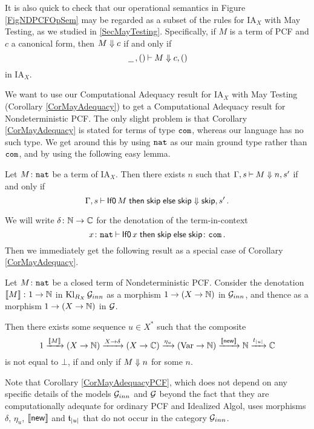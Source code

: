 It is also quick to check that our operational semantics in Figure \ref{FigNDPCFOpSem} may be regarded as a subset of the rules for IA${}_X$ with May Testing, as we studied in \sec \ref{SecMayTesting}.
Specifically, if $M$ is a term of PCF and $c$ a canonical form, then $M\Downarrow c$ if and only if
\[
  \,\underline{\hspace{1.5ex}}\,,()\mathbin{\vdash} M\Downarrow c,()
  \]
in IA${}_X$.

We want to use our Computational Adequacy result for IA${}_X$ with May Testing (Corollary \ref{CorMayAdequacy}) to get a Computational Adequacy result for Nondeterministic PCF.
The only slight problem is that Corollary \ref{CorMayAdequacy} is stated for terms of type ${\mathtt{com}}$, whereas our language has no such type.  
We get around this by using ${\mathtt{nat}}$ as our main ground type rather than ${\mathtt{com}}$, and by using the following easy lemma.

\begin{lemma}
  Let $M\colon{\mathtt{nat}}$ be a term of IA${}_X$.  
  Then there exists $n$ such that $\Gamma,s\mathbin{\vdash} M\Downarrow n,s'$ if and only if
  \[
    \Gamma,s\mathbin{\vdash} \operatorname{{\mathsf{If0}}} M \mathrel{\mathsf{then}} {\mathsf{skip}} \mathrel{\mathsf{else}} {\mathsf{skip}} \Downarrow {\mathsf{skip}}, s'\,.
    \]
\end{lemma}

We will write $\delta\colon \mathbb{N} \to \mathbb{C}$ for the denotation of the term-in-context 
\[
  x\colon{\mathtt{nat}} \mathbin{\vdash} \operatorname{{\mathsf{If0}}} x \mathrel{\mathsf{then}} {\mathsf{skip}} \mathrel{\mathsf{else}} {\mathsf{skip}} \colon {\mathtt{com}}\,.
  \]
Then we immediately get the following result as a special case of Corollary \ref{CorMayAdequacy}.

\begin{corollary}
  Let $M\colon{\mathtt{nat}}$ be a closed term of Nondeterministic PCF.
  Consider the denotation $\left\llbracket M\right\rrbracket \colon 1 \to \mathbb{N}$ in $\operatorname{Kl}_{R_X}\mathcal G_{inn}$ as a morphism $1 \to (X \to \mathbb{N})$ in $\mathcal G_{inn}$, and thence as a morphism $1 \to (X \to \mathbb{N})$ in $\mathcal G$.

  Then there exists some sequence $u\in X^*$ such that the composite
  \[
    1 \xrightarrow{\left\llbracket M\right\rrbracket}
    (X \to \mathbb{N}) \xrightarrow{X \to \delta}
    (X \to \mathbb{C}) \xrightarrow{\eta_u}
    (\operatorname{Var} \to \mathbb{N}) \xrightarrow{\left\llbracket\operatorname{{\mathsf{new}}}\right\rrbracket}
    \mathbb{N} \xrightarrow{t_{|u|}}
    \mathbb{C}
    \]
  is not equal to $\bot$, if and only if $M\Downarrow n$ for some $n$.
  \label{CorMayAdequacyPCF}
\end{corollary}

Note that Corollary \ref{CorMayAdequacyPCF}, which does not depend on any specific details of the models $\mathcal G_{inn}$ and $\mathcal G$ beyond the fact that they are computationally adequate for ordinary PCF and Idealized Algol, uses morphisms $\delta$, $\eta_u$, $\left\llbracket\operatorname{{\mathsf{new}}}\right\rrbracket$ and $\mathfrak t_{|u|}$ that do not occur in the category $\mathcal G_{inn}$.

